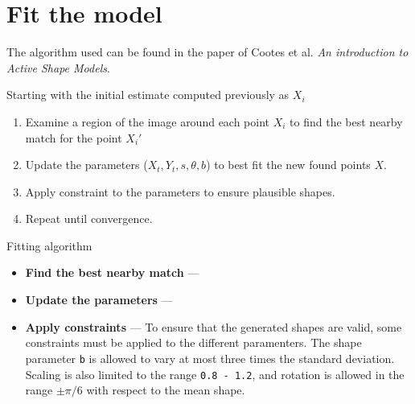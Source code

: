 \section{Fit the model}

The algorithm used can be found in the paper of Cootes et al.
\textit{An introduction to Active Shape Models}.

Starting with the initial estimate computed previously as $X_i$
\begin{algorithm}[h]
  \begin{enumerate}
  \item Examine a region of the image around each point $X_i$
    to find the best nearby match for the point ${X_i}'$
  \item Update the parameters ($X_t, Y_t, s, \theta, b$) to best
    fit the new found points $X$.
  \item Apply constraint to the parameters to ensure
    plausible shapes.
  \item Repeat until convergence.
 \end{enumerate}
\caption{Fitting algorithm}
\end{algorithm}

\begin{itemize}
\item \textbf{Find the best nearby match} --- 
\item \textbf{Update the parameters} --- 
\item \textbf{Apply constraints} --- To ensure that the generated
  shapes are valid, some constraints must be applied to the different
  paramenters. The shape parameter \texttt{b} is allowed to vary at most
  three times the standard deviation. Scaling is also limited to the range
  \texttt{0.8 - 1.2}, and rotation is allowed in the range $\pm\pi/6$
  with respect to the mean shape.
\end{itemize}